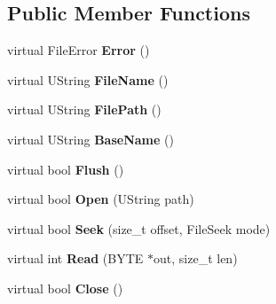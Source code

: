 \subsection*{Public Member Functions}
\begin{DoxyCompactItemize}
\item 
\hypertarget{class_vixen_1_1_file_a14ec6c12a37a1f60617bbf9313b24d8f}{}virtual File\+Error {\bfseries Error} ()\label{class_vixen_1_1_file_a14ec6c12a37a1f60617bbf9313b24d8f}

\item 
\hypertarget{class_vixen_1_1_file_a10b0b7cf7ead8a8936aa22cc1f6b9318}{}virtual U\+String {\bfseries File\+Name} ()\label{class_vixen_1_1_file_a10b0b7cf7ead8a8936aa22cc1f6b9318}

\item 
\hypertarget{class_vixen_1_1_file_a2985c6a6cb9a53f6eef0e125e6885051}{}virtual U\+String {\bfseries File\+Path} ()\label{class_vixen_1_1_file_a2985c6a6cb9a53f6eef0e125e6885051}

\item 
\hypertarget{class_vixen_1_1_file_a55e0c906130d29cf5583503016342ddd}{}virtual U\+String {\bfseries Base\+Name} ()\label{class_vixen_1_1_file_a55e0c906130d29cf5583503016342ddd}

\item 
\hypertarget{class_vixen_1_1_file_ac3869f8194a442f31d86122dfa8a3837}{}virtual bool {\bfseries Flush} ()\label{class_vixen_1_1_file_ac3869f8194a442f31d86122dfa8a3837}

\item 
\hypertarget{class_vixen_1_1_file_a24d43934cc6c607ebba11596c7429595}{}virtual bool {\bfseries Open} (U\+String path)\label{class_vixen_1_1_file_a24d43934cc6c607ebba11596c7429595}

\item 
\hypertarget{class_vixen_1_1_file_a4def6de72e2f89dc08c1cd1f0c051bad}{}virtual bool {\bfseries Seek} (size\+\_\+t offset, File\+Seek mode)\label{class_vixen_1_1_file_a4def6de72e2f89dc08c1cd1f0c051bad}

\item 
\hypertarget{class_vixen_1_1_file_ad90fede619bb354587493474f45a7bf5}{}virtual int {\bfseries Read} (B\+Y\+T\+E $\ast$out, size\+\_\+t len)\label{class_vixen_1_1_file_ad90fede619bb354587493474f45a7bf5}

\item 
\hypertarget{class_vixen_1_1_file_a3f1848aba4558bd98714c528c3fe0b73}{}virtual bool {\bfseries Close} ()\label{class_vixen_1_1_file_a3f1848aba4558bd98714c528c3fe0b73}


\end{DoxyCompactItemize}
